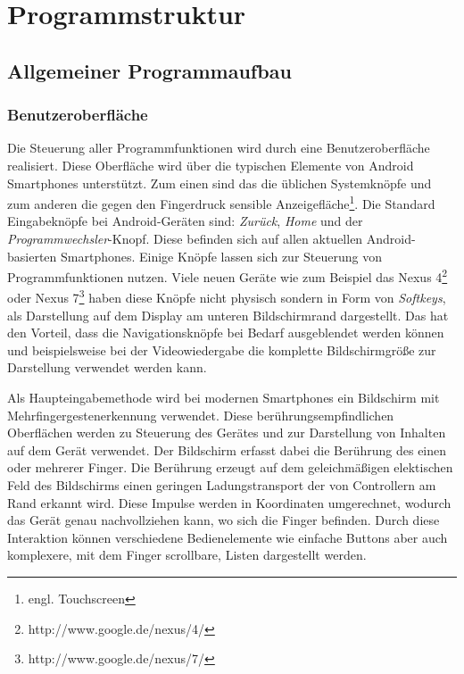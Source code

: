 \section{Programmstruktur}

\subsection{Allgemeiner Programmaufbau}

\subsubsection{Benutzeroberfläche}

Die Steuerung aller Programmfunktionen wird durch eine Benutzeroberfläche realisiert. Diese Oberfläche wird über die typischen Elemente von Android Smartphones unterstützt. Zum einen sind das die üblichen Systemknöpfe und zum anderen die gegen den Fingerdruck sensible Anzeigefläche\footnote{engl. Touchscreen}. Die Standard Eingabeknöpfe bei Android-Geräten sind: \textit{Zurück}, \textit{Home} und der \textit{Programmwechsler}-Knopf. Diese befinden sich auf allen aktuellen Android-basierten Smartphones. Einige Knöpfe lassen sich zur Steuerung von Programmfunktionen nutzen. Viele neuen Geräte wie zum Beispiel das Nexus 4\footnote{http://www.google.de/nexus/4/} oder Nexus 7\footnote{http://www.google.de/nexus/7/} haben diese Knöpfe nicht physisch sondern in Form von \emph{Softkeys}, als Darstellung auf dem Display am unteren Bildschirmrand dargestellt. Das hat den Vorteil, dass die Navigationsknöpfe bei Bedarf ausgeblendet werden können und beispielsweise bei der Videowiedergabe die komplette Bildschirmgröße zur Darstellung verwendet werden kann.

Als Haupteingabemethode wird bei modernen Smartphones ein Bildschirm mit Mehrfingergestenerkennung verwendet. Diese berührungsempfindlichen Oberflächen werden zu Steuerung des Gerätes und zur Darstellung von Inhalten auf dem Gerät verwendet. Der Bildschirm erfasst dabei die Berührung des einen oder mehrerer Finger. Die Berührung erzeugt auf dem geleichmäßigen elektischen Feld des Bildschirms einen geringen Ladungstransport der von Controllern am Rand erkannt wird. Diese Impulse werden in Koordinaten umgerechnet, wodurch das Gerät genau nachvollziehen kann, wo sich die Finger befinden. Durch diese Interaktion können verschiedene Bedienelemente wie einfache Buttons aber auch komplexere, mit dem Finger scrollbare, Listen dargestellt werden.

